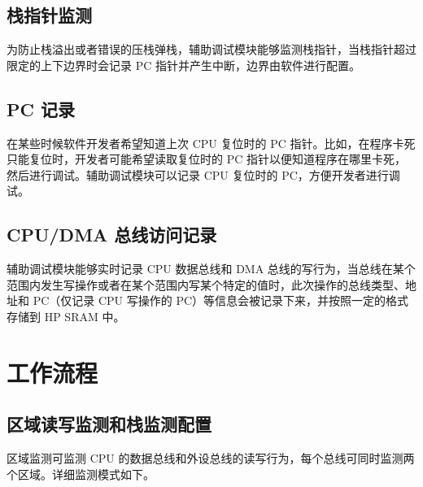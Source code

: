 \documentclass[main\_\_CN.tex]{subfiles}
\begin{document}
\subsection{栈指针监测}
为防止栈溢出或者错误的压栈弹栈，辅助调试模块能够监测栈指针，当栈指针超过限定的上下边界时会记录 PC 指针并产生中断，边界由软件进行配置。

\subsection{PC 记录}
在某些时候软件开发者希望知道上次 CPU 复位时的 PC 指针。比如，在程序卡死只能复位时，开发者可能希望读取复位时的 PC 指针以便知道程序在哪里卡死，然后进行调试。辅助调试模块可以记录 CPU 复位时的 PC，方便开发者进行调试。

\subsection{CPU/DMA 总线访问记录}
辅助调试模块能够实时记录 CPU 数据总线和 DMA 总线的写行为，当总线在某个范围内发生写操作或者在某个范围内写某个特定的值时，此次操作的总线类型、地址和 PC（仅记录 CPU 写操作的 PC）等信息会被记录下来，并按照一定的格式存储到 HP SRAM 中。

\section{工作流程}
\label{sec:dbgassist-recommended-operation}

\subsection{区域读写监测和栈监测配置}

区域监测可监测 CPU 的数据总线和外设总线的读写行为，每个总线可同时监测两个区域。详细监测模式如下。
\end{document}
